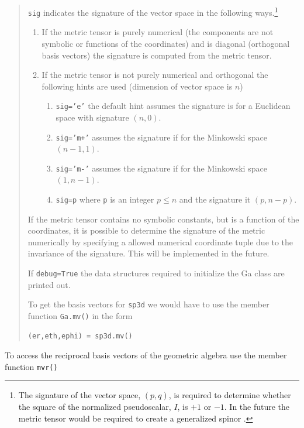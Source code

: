 \documentclass[12pt]{report}
\newcommand{\T}[1]{\texttt{#1}}
\begin{document}
\begin{quote}
   \T{sig} indicates the signature of the vector space in the following ways.\footnote{The 
   signature of the vector space, $(p,q)$, is required to determine whether the square of
   the normalized pseudoscalar, $I$, is $+1$ or $-1$. In the future the metric tensor would
   be required to create a generalized spinor \cite[p.~106]{Hestenes}.}
   \begin{enumerate}
       \item If the metric tensor is purely numerical (the components are not symbolic or 
             functions of the coordinates) and is diagonal (orthogonal basis vectors) the 
             signature is computed from the metric tensor.
       \item If the metric tensor is not purely numerical and orthogonal the following hints
             are used (dimension of vector space is $n$)
       \begin{enumerate}
       		\item \T{sig='e'} the default hint assumes the signature is for a Euclidean space
       		      with signature $(n,0)$.
       		\item \T{sig='m+'} assumes the signature if for the Minkowski space $(n-1,1)$.
       		\item \T{sig='m-'} assumes the signature if for the Minkowski space $(1,n-1)$.
       		\item \T{sig=p} where \T{p} is an integer $p\le n$ and the signature it $(p,n-p)$. 
       \end{enumerate}
   \end{enumerate}
   If the metric tensor contains no symbolic constants, but is a function of the coordinates, it is
   possible to determine the signature of the metric numerically by specifying a allowed numerical
   coordinate tuple due to the invariance of the signature.  This will be implemented in the future. 

   If \T{debug=True} the data structures required to initialize the Ga class
   are printed out.

   To get the basis vectors for \T{sp3d} we would have to use the member function
   \T{Ga.mv()} in the form
   \begin{lstlisting}[numbers=none]
    (er,eth,ephi) = sp3d.mv()
   \end{lstlisting}
\end{quote}

To access the reciprocal basis vectors of the geometric algebra use the member function \T{mvr()}
\end{document}
